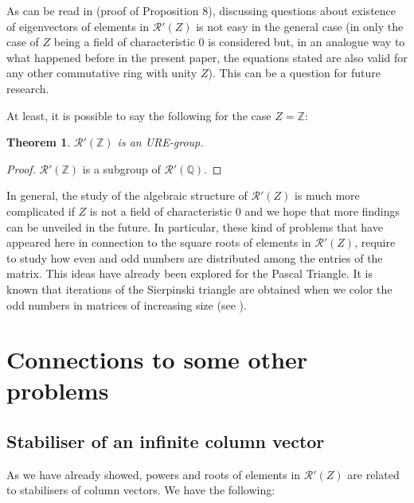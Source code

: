 \documentclass[preprint,12pt]{elsarticle}
\newtheorem{thm}{Theorem}
\begin{document}
As can be read in \cite{LMP} (proof of Proposition 8), discussing questions about existence of eigenvectors of elements in $\mathcal R'(Z)$ is not easy in the general case (in \cite{LMP} only the case of $Z$ being a field of characteristic 0 is considered but, in an analogue way to what happened before in the present paper, the equations stated are also valid for any other commutative ring with unity $Z$). This can be a question for future research.


At least, it is possible to say the following for the case $Z=\mathbb Z$:


\begin{thm} $\mathcal R'(\mathbb Z)$ is an  URE-group.


\end{thm}


\begin{proof} $\mathcal R'(\mathbb Z)$ is a subgroup of $\mathcal R'(\mathbb Q)$.
\end{proof}


In general, the study of the algebraic structure of $\mathcal R'(Z)$ is much more complicated if $Z$ is not a field of characteristic 0 and we hope that more findings can be unveiled in the future.  In particular, these kind of problems that have appeared here in connection to the square roots of elements in $\mathcal R'(Z)$, require to study how even and odd numbers are distributed among the entries of the matrix. This ideas have already been explored for the Pascal Triangle. It is known that iterations of  the Sierpinski triangle are obtained when we color the odd numbers in matrices of increasing size (see \cite{St}).

\section{Connections to some other problems}\label{SectionConnections}

\subsection{Stabiliser of an infinite column vector}

As we have already showed, powers and roots of elements in $\mathcal R'(Z)$ are related to stabilisers of column vectors. We have the following:
\end{document}
